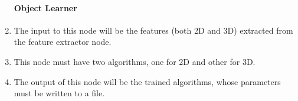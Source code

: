 \begin{enumerate}[label=\textbf{FR\threedigits*}, leftmargin=2cm]


\paragraph{Object Learner}
	\item The input to this node will be the features (both 2D and 3D) extracted from the feature extractor node. 
	\item This node must have two algorithms, one for 2D and other for 3D. 
	\item The output of this node will be the trained algorithms, whose parameters must be written to a file. 


\end{enumerate}
